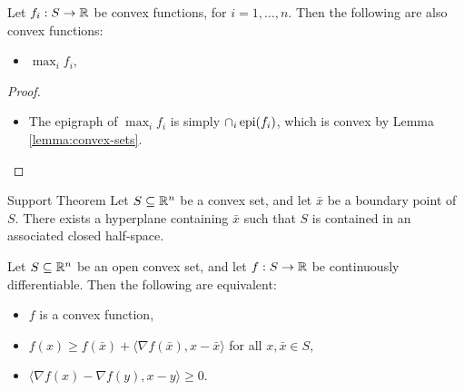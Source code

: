 \begin{lemma}
    Let $f_i: S \to \mathbb{R}$ be convex functions, for $i = 1, \ldots, n$. Then the following are also convex functions:
    \begin{itemize}
        \item $\max_{i}f_i$,
    \end{itemize}
\end{lemma}

\begin{proof}\proofbreak
    \begin{itemize}
        \item The epigraph of $\max_{i}f_i$ is simply $\cap_{i}\operatorname{epi}(f_i)$, which is convex by Lemma \ref{lemma:convex-sets}.
    \end{itemize}
\end{proof}

\begin{thm}{Support Theorem}\label{support-theorem}\proofbreak
    Let $S \subseteq \mathbb{R}^n$ be a convex set, and let $\bar{x}$ be a boundary point of $S$. There exists a hyperplane containing $\bar{x}$ such that $S$ is contained in an associated closed half-space.
\end{thm}

\begin{thm}\label{convex-function-tangent-hyperplane}
    Let $S \subseteq \mathbb{R}^n$ be an open convex set, and let $f: S \to \mathbb{R}$ be continuously differentiable. Then the following are equivalent:
    \begin{itemize}
        \item $f$ is a convex function,
        \item $f(x) \geq f(\bar{x}) + \langle \nabla f(\bar{x}), x - \bar{x}\rangle$ for all $x, \bar{x} \in S$,
        \item $\langle \nabla f(x) - \nabla f(y), x - y \rangle \geq 0$.
    \end{itemize}
\end{thm}

